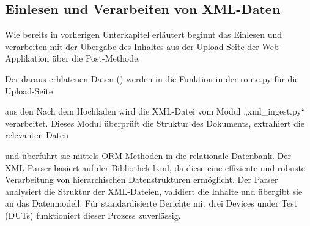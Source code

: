 \subsection{Einlesen und Verarbeiten von XML-Daten}
\label{subsec:einlesen-und-verarbeiten-von-xml-daten}

Wie bereits in vorherigen Unterkapitel erläutert beginnt das Einlesen und verarbeiten mit der Übergabe des Inhaltes aus der
Upload-Seite der Web-Applikation über die Post-Methode.

Der daraus erhlatenen Daten () werden in die Funktion  in der route.py für die Upload-Seite

aus den  Nach dem Hochladen wird die XML-Datei vom Modul „xml\_ingest.py“ verarbeitet.
Dieses Modul überprüft die Struktur des Dokuments, extrahiert die relevanten Daten



und überführt sie mittels ORM-Methoden in die relationale Datenbank.
Der XML-Parser basiert auf der Bibliothek lxml, da diese eine effiziente und robuste Verarbeitung von hierarchischen Datenstrukturen ermöglicht.
Der Parser analysiert die Struktur der XML-Dateien, validiert die Inhalte und übergibt sie an das Datenmodell.
Für standardisierte Berichte mit drei Devices under Test (DUTs) funktioniert dieser Prozess zuverlässig.



